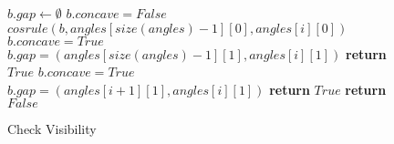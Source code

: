 \documentclass{ieeeaccess}
\begin{document}
\begin{figure}
\begin{algorithmic}[1]
\State $b.gap \gets \emptyset$
\State $b.concave = False$
\If
{$cosrule(b,angles[size(angles)-1][0], angles[i][0])$}
\State $b.concave = True$
\State $b.gap = (angles[size(angles)-1][1], angles[i][1])$
\EndIf
   \State\textbf{return} $True$
   \EndIf
\EndIf
{}
\State $b.concave = True$\;
\State $b.gap = (angles[i + 1][1],angles[i][1])$
  \EndIf
  \State\textbf{return} $True$
\EndIf
\EndFor
\State\textbf{return} $False$
\EndProcedure
\end{algorithmic}
\caption{Check Visibility}
\label{algo:checkVisibility2}
\end{figure}

\EOD
\end{document}
